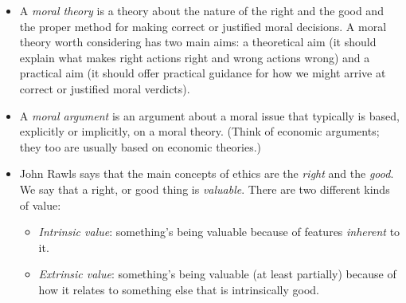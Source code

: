 \documentclass{article}
\begin{document}
\begin{spacing}{1.2}
\begin{itemize}
            \item A \emph{moral theory} is a theory about the nature of the right and the good and the proper method for making correct or justified moral decisions. A moral theory worth considering has two main aims: a theoretical aim (it should explain what makes right actions right and wrong actions wrong) and a practical aim (it should offer practical guidance for how we might arrive at correct or justified moral verdicts).
            \item A \emph{moral argument} is an argument about a moral issue
            that typically is based, explicitly or implicitly, on a moral
            theory. (Think of economic arguments; they too are usually
            based on economic theories.)
            \item John Rawls says that the main concepts of ethics are the \emph{right} and the \emph{good}. We say that a right, or good thing is \emph{valuable}. There are two different kinds of value:
            \begin{itemize}
                \item \emph{Intrinsic value}: something's being valuable because of features \emph{inherent} to it.
                \item \emph{Extrinsic value}: something's being valuable (at least partially) because of how it relates to something else that is intrinsically good.
            \end{itemize}
        \end{itemize}
    \end{spacing}
\end{document}
